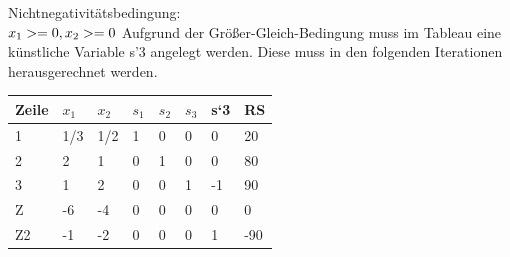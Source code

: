 Nichtnegativitätsbedingung:\\
\begin{math}
x_1 >= 0, x_2>= 0\\
\end{math}
Aufgrund der Größer-Gleich-Bedingung muss im Tableau eine künstliche Variable s’3 angelegt werden. Diese muss in den folgenden Iterationen herausgerechnet werden.\\
\begin{table}[!ht]
\begin{tabular}{|l|l|l|l|l|l|l|l|}
\hline
\rowcolor[HTML]{C0C0C0} 
Zeile                      & $x_1$                          & $x_2$                          & $s_1$                        & $s_2$                        & $s_3$                        & s`3 & RS  \\ \hline
\cellcolor[HTML]{C0C0C0}1  & \cellcolor[HTML]{FFFFFF}1/3 & \cellcolor[HTML]{CBCEFB}1/2 & \cellcolor[HTML]{FFFFFF}1 & \cellcolor[HTML]{FFFFFF}0 & \cellcolor[HTML]{FFFFFF}0 & 0   & 20  \\ \hline
\cellcolor[HTML]{C0C0C0}2  & \cellcolor[HTML]{FFFFFF}2   & \cellcolor[HTML]{FFFFFF}1   & \cellcolor[HTML]{FFFFFF}0 & \cellcolor[HTML]{FFFFFF}1 & \cellcolor[HTML]{FFFFFF}0 & 0   & 80  \\ \hline
\cellcolor[HTML]{C0C0C0}3  & \cellcolor[HTML]{FFFFFF}1   & \cellcolor[HTML]{FFFFFF}2   & \cellcolor[HTML]{FFFFFF}0 & \cellcolor[HTML]{FFFFFF}0 & \cellcolor[HTML]{FFFFFF}1 & -1  & 90  \\ \hline
\cellcolor[HTML]{C0C0C0}Z  & \cellcolor[HTML]{FFFFFF}-6  & \cellcolor[HTML]{FFFFFF}-4  & \cellcolor[HTML]{FFFFFF}0 & \cellcolor[HTML]{FFFFFF}0 & \cellcolor[HTML]{FFFFFF}0 & 0   & 0   \\ \hline
\cellcolor[HTML]{C0C0C0}Z2 & -1                          & -2                          & 0                         & 0                         & 0                         & 1   & -90 \\ \hline
\end{tabular}
\end{table}
\\
